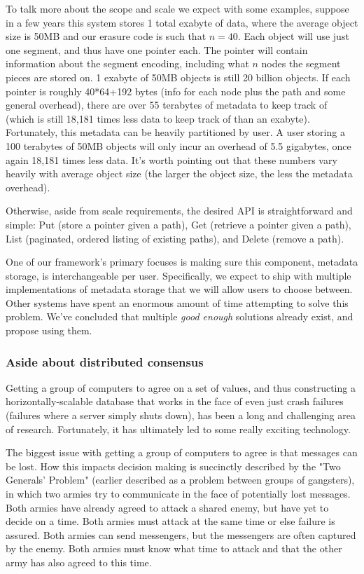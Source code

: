 \documentclass[a4paper,10pt]{article}
\begin{document}
To talk more about the scope and scale we expect with some examples,
suppose in a few years this system stores 1 total exabyte of data,
where the average object size is 50MB and our erasure code is such that $n=40$.
Each object will use just one segment, and thus have one pointer each. The
pointer will contain information about the segment encoding, including what
$n$ nodes the segment pieces are stored on. 1 exabyte of 50MB objects is still
20 billion objects. If each pointer is roughly 40*64+192 bytes (info for each
node plus the path and some general overhead), there are over 55 terabytes of
metadata to keep track of (which is still 18,181 times less data to keep track
of than an exabyte). Fortunately, this metadata can be heavily partitioned by
user. A user storing a 100 terabytes of 50MB objects will only incur an
overhead of 5.5 gigabytes, once again 18,181 times less data. It's worth
pointing out that these numbers vary heavily with average object size (the
larger the object size, the less the metadata overhead).

Otherwise, aside from scale requirements, the desired API is straightforward
and simple: Put (store a pointer given a path), Get (retrieve a pointer given a
path), List (paginated, ordered listing of existing paths), and Delete (remove a
path).

One of our framework's primary focuses is making sure this component, metadata
storage, is interchangeable per user. Specifically, we expect to ship with
multiple implementations of metadata storage that we will allow users to choose
between. Other systems have spent an enormous amount of time attempting to
solve this problem. We've concluded that multiple {\em good enough} solutions
already exist, and propose using them.

\subsubsection{Aside about distributed consensus}

Getting a group of computers to agree on a set of values, and thus constructing
a horizontally-scalable database that works in the face of even just
crash failures (failures where a server simply shuts down), has
been a long and challenging area of research. Fortunately, it has ultimately
led to some really exciting technology.

The biggest issue with getting a group of computers to agree is that messages
can be lost. How this impacts decision making is succinctly
described by the "Two Generals' Problem"\cite{two-generals} (earlier described
as a problem between groups of gangsters\cite{two-gangsters}), in which two
armies try to communicate in the face of potentially lost messages. Both armies
have already agreed to attack a shared enemy, but have yet to decide on a time.
Both armies must attack at the same time or else failure is assured.
Both armies can send messengers, but the messengers are often captured by the
enemy.
Both armies must know what time to attack and that the other army has also
agreed to this time.
\end{document}
